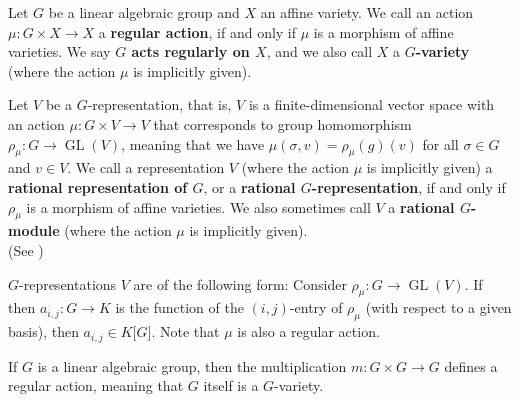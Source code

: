 \begin{definition}
  Let $G$ be a linear algebraic group and $X$ an affine variety.
  We call an action $\mu \colon G \times X \rightarrow X$ a \textbf{regular action}, if and only if $\mu$ is a morphism of affine varieties.
  We say \textbf{$ G $ acts regularly on $ X $}, and we also call $X$ a \textbf{$G$-variety} (where the action $\mu$ is implicitly given).
  
  Let $V$ be a $G$-representation, that is, $V$ is a finite-dimensional vector space with an action $\mu \colon G \times V \rightarrow V$ that corresponds to group homomorphism $\rho_\mu \colon G \rightarrow \operatorname{GL}(V)$, meaning that we have $ \mu(\sigma,v) = \rho_{\mu}(g)(v)$ for all $\sigma \in G$ and $v \in V$.
  We call a representation $V$ (where the action $\mu$ is implicitly given) a \textbf{rational representation of $G$}, or a \textbf{rational $G$-representation}, if and only if $\rho_\mu$ is a morphism of affine varieties.
  We also sometimes call $V$ a \textbf{rational $G$-module} (where the action $\mu$ is implicitly given).\\
  (See \cite[p.~31]{DK15})
  
\end{definition}

\begin{remark}
  $G$-representations $V$ are of the following form:
  Consider \linebreak$\rho_{\mu} \colon G \rightarrow \operatorname{GL}(V)$.
  If then $ a_{i,j} : G \rightarrow K $ is the function of the $\left( i,j \right) $-entry of $\rho_{\mu}$ (with respect to a given basis), then $ a_{i,j} \in K\lbrack G\rbrack $.
  Note that $\mu$ is also a regular action.
\end{remark}

\begin{dexample}
  If $G$ is a linear algebraic group, then the multiplication \linebreak$m \colon G \times G \rightarrow G$ defines a regular action, meaning that $G$ itself is a $G$-variety.
\end{dexample}

